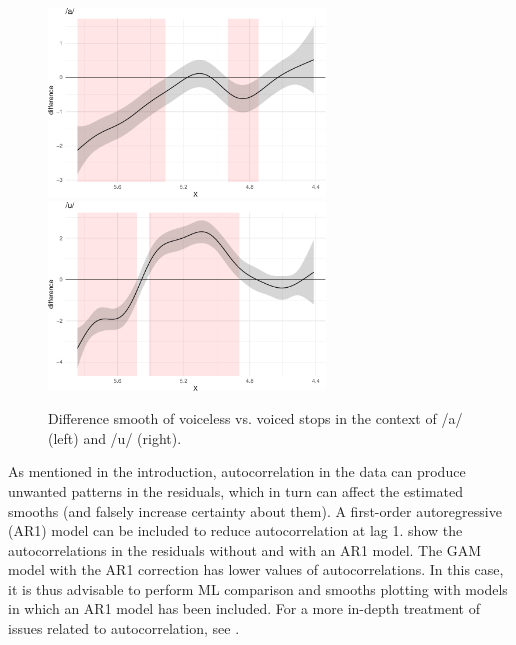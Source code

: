 \documentclass[12pt,]{article}
\begin{document}
\begin{figure}

{\centering \includegraphics[width=.7\linewidth,height=5cm]{2018-polar-gam_files/figure-latex/diff-it01-1} \includegraphics[width=.7\linewidth,height=5cm]{2018-polar-gam_files/figure-latex/diff-it01-2} 

}

\caption{Difference smooth of voiceless vs. voiced stops in the context of /a/ (left) and /u/ (right).}\label{f:diff-it01}
\end{figure}

As mentioned in the introduction, autocorrelation in the data can
produce unwanted patterns in the residuals, which in turn can affect the
estimated smooths (and falsely increase certainty about them). A
first-order autoregressive (AR1) model can be included to reduce
autocorrelation at lag 1.  show the autocorrelations in
the residuals without and with an AR1 model. The GAM model with the AR1
correction has lower values of autocorrelations. In this case, it is
thus advisable to perform ML comparison and smooths plotting with models
in which an AR1 model has been included. For a more in-depth treatment
of issues related to autocorrelation, see \citet{soskuthy2017}.
\end{document}
